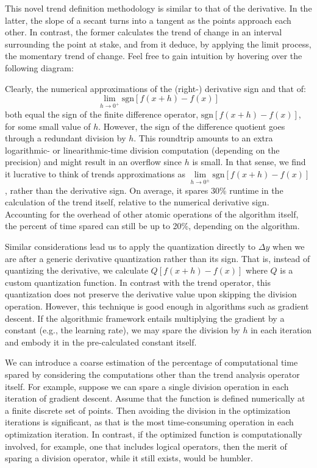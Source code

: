 \documentclass[11pt]{book}
\begin{document}
This novel trend definition methodology is similar to that of the derivative. In the latter, the slope of a secant turns into a tangent as the points approach each other. In contrast, the former calculates the trend of change in an interval surrounding the point at stake, and from it deduce, by applying the limit process, the momentary trend of change. Feel free to gain intuition by hovering over the following diagram:

Clearly, the numerical approximations of the (right-) derivative sign and that of: $$\underset{{\scriptscriptstyle h\rightarrow0^{+}}}{\lim}\text{sgn}\left[f\left(x+h\right)-f\left(x\right)\right]$$both equal the sign of the finite difference operator, $\text{sgn}\left[f\left(x+h\right)-f\left(x\right)\right]$, for some small value of $h$. However, the sign of the difference quotient goes through a redundant division by $h$. This roundtrip amounts to an extra logarithmic- or linearithmic-time division computation (depending on the precision) and might result in an overflow since $h$ is small. In that sense, we find it lucrative to think of trends approximations as $\underset{{\scriptscriptstyle h\rightarrow0^{\pm}}}{\lim}\text{sgn}\left[f\left(x+h\right)-f\left(x\right)\right]$, rather than the derivative sign. On average, it spares 30\% runtime in the calculation of the trend itself, relative to the numerical derivative sign. Accounting for the overhead of other atomic operations of the algorithm itself, the percent of time spared can still be up to 20\%, depending on the algorithm.

Similar considerations lead us to apply the quantization directly to $\Delta y$ when we are after a generic derivative quantization rather than its sign. That is, instead of quantizing the derivative, we calculate $Q\left[f\left(x+h\right)-f\left(x\right)\right]$ where $Q$ is a custom quantization function. In contrast with the trend operator, this quantization does not preserve the derivative value upon skipping the division operation. However, this technique is good enough in algorithms such as gradient descent. If the algorithmic framework entails multiplying the gradient by a constant (e.g., the learning rate), we may spare the division by $h$ in each iteration and embody it in the pre-calculated constant itself.

We can introduce a coarse estimation of the percentage of computational time spared by considering the computations other than the trend analysis operator itself. For example, suppose we can spare a single division operation in each iteration of gradient descent. Assume that the function is defined numerically at a finite discrete set of points. Then avoiding the division in the optimization iterations is significant, as that is the most time-consuming operation in each optimization iteration. In contrast, if the optimized function is computationally involved, for example, one that includes logical operators, then the merit of sparing a division operator, while it still exists, would be humbler.
\end{document}
